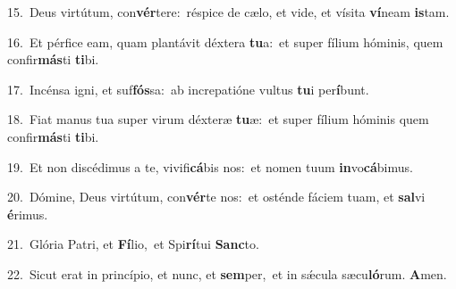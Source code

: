 {\numbfont\textcolor{\numbcolor}{15.}}~Deus virtútum, con\-\textbf{vér}\-tere:~\star réspice de cælo, et vide, et vísita \textbf{ví}\-neam \textbf{is}\-tam.\par
{\numbfont\textcolor{\numbcolor}{16.}}~Et pérfice eam, quam plantávit déxtera \textbf{tu}\-a:~\star et super fílium hóminis, quem confir\-\textbf{más}\-ti \textbf{ti}\-bi.\par
{\numbfont\textcolor{\numbcolor}{17.}}~Incénsa igni, et suf\-\textbf{fós}\-sa:~\star ab increpatióne vultus \textbf{tu}\-i per\-\textbf{í}\-bunt.\par
{\numbfont\textcolor{\numbcolor}{18.}}~Fiat manus tua super virum déxteræ \textbf{tu}\-æ:~\star et super fílium hóminis quem confir\-\textbf{más}\-ti \textbf{ti}\-bi.\par
{\numbfont\textcolor{\numbcolor}{19.}}~Et non discédimus a te, vivifi\-\textbf{cá}\-bis nos:~\star et nomen tuum \textbf{in}\-vo\-\textbf{cá}\-bimus.\par
{\numbfont\textcolor{\numbcolor}{20.}}~Dómine, Deus virtútum, con\-\textbf{vér}\-te nos:~\star et osténde fáciem tuam, et \textbf{sal}\-vi \textbf{é}\-rimus.\par
{\numbfont\textcolor{\numbcolor}{21.}}~Glória Patri, et \textbf{Fí}\-lio,~\star et Spi\-\textbf{rí}\-tui \textbf{Sanc}\-to.\par
{\numbfont\textcolor{\numbcolor}{22.}}~Sicut erat in princípio, et nunc, et \textbf{sem}\-per,~\star et in sǽcula sæcu\-\textbf{ló}\-rum. \textbf{A}\-men.\par
